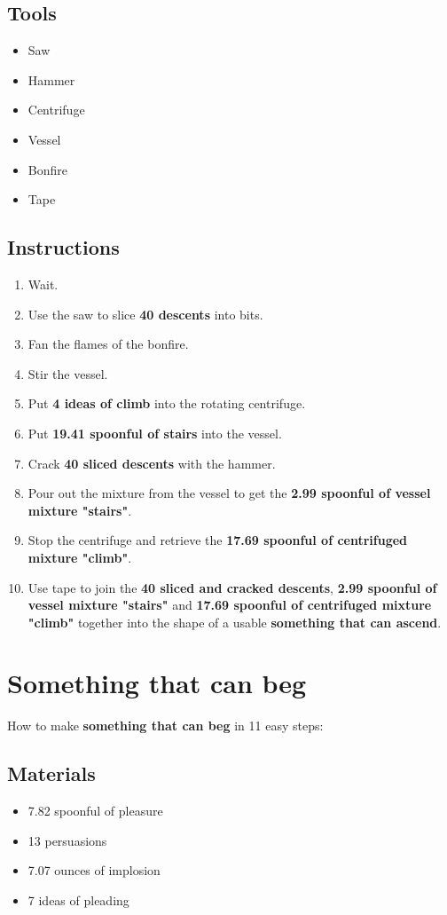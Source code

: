 \documentclass{article}
\begin{document}
\subsection{Tools}\begin{itemize}
\item 
Saw
\item 
Hammer
\item 
Centrifuge
\item 
Vessel
\item 
Bonfire
\item 
Tape
\end{itemize}
\subsection{Instructions}\begin{enumerate}
\item 
Wait.
\item 
Use the saw to slice \textbf{40 descents} into bits.
\item 
Fan the flames of the bonfire.
\item 
Stir the vessel.
\item 
Put \textbf{4 ideas of climb} into the rotating centrifuge.
\item 
Put \textbf{19.41 spoonful of stairs} into the vessel.
\item 
Crack \textbf{40 sliced descents} with the hammer.
\item 
Pour out the mixture from the vessel to get the \textbf{2.99 spoonful of vessel mixture "stairs"}.
\item 
Stop the centrifuge and retrieve the \textbf{17.69 spoonful of centrifuged mixture "climb"}.
\item 
Use tape to join the \textbf{40 sliced and cracked descents}, \textbf{2.99 spoonful of vessel mixture "stairs"} and \textbf{17.69 spoonful of centrifuged mixture "climb"} together into the shape of a usable \textbf{something that can ascend}.
\end{enumerate}
\newpage
\section{Something that can beg}How to make \textbf{something that can beg} in 11 easy steps:

\subsection{Materials}\begin{itemize}
\item 
7.82 spoonful of pleasure
\item 
13 persuasions
\item 
7.07 ounces of implosion
\item 
7 ideas of pleading
\end{itemize}
\end{document}
